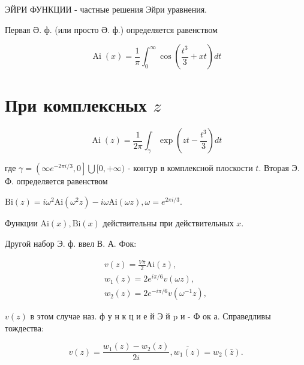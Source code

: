 \documentclass[10pt]{article}
\begin{document}
ЭЙРИ ФУНКЦИИ - частные решения Эйри уравнения.



Первая Ә. ф. (или просто Ә. ф.) определяется равенством



\[

\operatorname{Ai}(x)=\frac{1}{\pi} \int_{0}^{\infty} \cos \left(\frac{t^{3}}{3}+x t\right) d t

\]



\section{При комплексных $z$}

\[

\operatorname{Ai}(z)=\frac{1}{2 \pi} \int_{\gamma} \exp \left(z t-\frac{t^{3}}{3}\right) d t

\]



где $\gamma=\left(\infty e^{-2 \pi i / 3}, 0\right] \bigcup[0,+\infty)$ - контур в комплексной плоскости $t$. Вторая Э. Ф. определяется равенством



$\mathrm{Bi}(z)=i \omega^{2} \mathrm{Ai}\left(\omega^{2} z\right)-i \omega \mathrm{Ai}(\omega z), \omega=e^{2 \pi i / 3}$.



Функции $\mathrm{Ai}(x), \mathrm{Bi}(x)$ действительны при действительных $x$.



Другой набор Э. ф. ввел В. А. Фок:



\[

\begin{gathered}

v(z)=\frac{V \bar{\pi}}{2} \mathrm{Ai}(z), \\

w_{1}(z)=2 e^{i \pi / 6} v(\omega z), \\

w_{2}(z)=2 e^{-i \pi / 6} v\left(\omega^{-1} z\right),

\end{gathered}

\]



$v(z)$ в этом случае наз. ф у н к ц и е й Э й $\mathrm{p}$ и - Ф ок а. Справедливы тождества:



\[

v(z)=\frac{w_{1}(z)-w_{2}(z)}{2 i}, \overline{w_{1}(z)}=w_{2}(\bar{z}) .

\]
\end{document}
